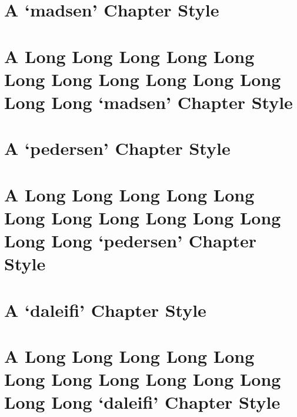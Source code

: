 \documentclass[10pt,a4paper,extrafontsizes,oldfontcommands,oneside]{memoir}
\begin{document}

\chapter{A `madsen' Chapter Style} %
\label{chap:a_madsen_chapter_style}



\chapter{A Long Long Long Long Long Long Long Long Long Long Long Long Long `madsen' Chapter Style} %
\label{chap:a_long_madsen_chapter_style}



\chapter{A `pedersen' Chapter Style} %
\label{chap:a_pedersen_chapter_style}



\chapter{A Long Long Long Long Long Long Long Long Long Long Long Long Long `pedersen' Chapter Style} %
\label{chap:a_long_pedersen_chapter_style}



\chapter{A `daleifi' Chapter Style} %
\label{chap:a_daleifi_chapter_style}



\chapter{A Long Long Long Long Long Long Long Long Long Long Long Long Long `daleifi' Chapter Style} %
\label{chap:a_long_daleifi_chapter_style}
\end{document}
